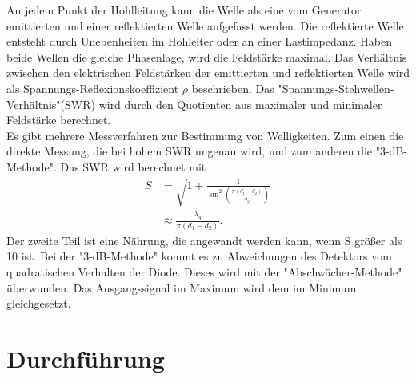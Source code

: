   An jedem Punkt der Hohlleitung kann die Welle als eine vom Generator emittierten und einer reflektierten Welle aufgefasst werden.
  Die reflektierte Welle entsteht durch Unebenheiten im Hohleiter oder an einer Lastimpedanz.
  Haben beide Wellen die gleiche Phasenlage, wird die Feldstärke maximal.
  Das Verhältnis zwischen den elektrischen Feldstärken der emittierten und reflektierten Welle wird als Spannungs-Reflexionskoeffizient $\rho$ beschrieben.
  Das "Spannungs-Stehwellen-Verhältnis"(SWR) wird durch den Quotienten aus maximaler und minimaler Feldstärke berechnet.\\
  Es gibt mehrere Messverfahren zur Bestimmung von Welligkeiten.
  Zum einen die direkte Messung, die bei hohem SWR ungenau wird, und zum anderen die "3-dB-Methode".
  Das SWR wird berechnet mit
  \begin{align}
    S &= \sqrt{1 + \frac{1}{\sin^2\left(\frac{\pi (d_1-d_2)}{\lambda_g}\right)}}\\
      &\approx \frac{\lambda_g}{\pi (d_1-d_2)}.
    \label{eqn:2}
  \end{align}
  Der zweite Teil ist eine Nährung, die angewandt werden kann, wenn S größer als 10 ist.
  Bei der "3-dB-Methode" kommt es zu Abweichungen des Detektors vom quadratischen Verhalten der Diode.
  Dieses wird mit der "Abschwächer-Methode" überwunden.
  Das Ausgangssignal im Maximum wird dem im Minimum gleichgesetzt.



  \section{Durchführung}
